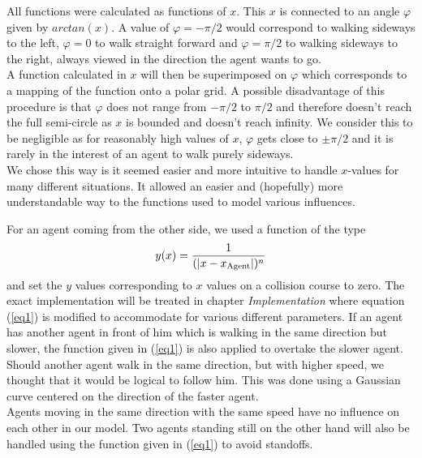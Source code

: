 \noi All functions were calculated as functions of $x$. This $x$ is connected to an angle $\varphi$ given by $arctan(x)$. A value of $\varphi = -\pi/2$ would correspond to walking sideways to the left, $\varphi = 0$ to walk straight forward and $\varphi = \pi/2$ to walking sideways to the right, always viewed in the direction the agent wants to go.\\
A function calculated in $x$ will then be superimposed on $\varphi$ which corresponds to a mapping of the function onto a polar grid. A possible disadvantage of this procedure is that $\varphi$ does not range from $-\pi/2$ to $\pi/2$ and therefore doesn't reach the full semi-circle as $x$ is bounded and doesn't reach infinity. We consider this to be negligible as for reasonably high values of $x$, $\varphi$ gets close to $\pm \pi/2$ and it is rarely in the interest of an agent to walk purely sideways.\\
We chose this way is it seemed easier and more intuitive to handle $x$-values for many different situations. It allowed an easier and (hopefully) more understandable way to the functions used to model various influences.

\noi For an agent coming from the other side, we used a function of the type
\begin{equation}\label{eq1}
	y(x) = \frac{1}{(|x-x_{\text{Agent}}|)^n}
\end{equation}
\noi and set the $y$ values corresponding to $x$ values on a collision course to zero. The exact implementation will be treated in chapter \textit{Implementation} where equation (\ref{eq1}) is modified to accommodate for various different parameters. If an agent has another agent in front of him which is walking in the same direction but slower, the function given in (\ref{eq1}) is also applied to overtake the slower agent.\\
Should another agent walk in the same direction, but with higher speed, we thought that it would be logical to follow him. This was done using a Gaussian curve centered on the direction of the faster agent.\\
Agents moving in the same direction with the same speed have no influence on each other in our model. Two agents standing still on the other hand will also be handled using the function given in (\ref{eq1}) to avoid standoffs.

